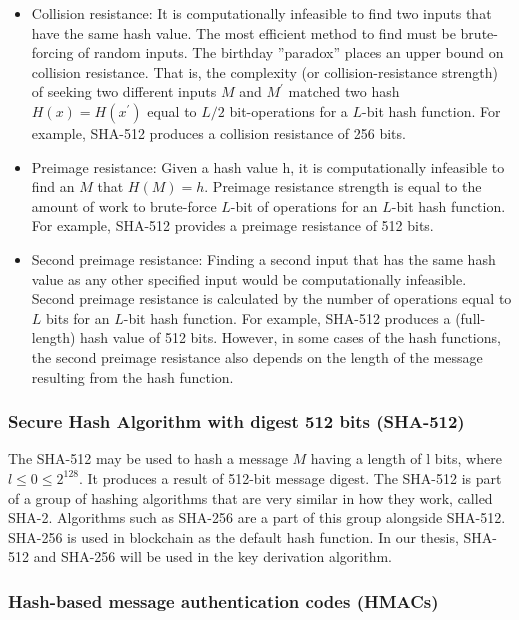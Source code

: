 \begin{itemize}
  \item Collision resistance: It is computationally infeasible to find two inputs that have the same hash value. The most efficient method to find must be brute-forcing of random inputs. The birthday ”paradox” places an upper bound on collision resistance. That is, the complexity (or collision-resistance strength) of seeking two different inputs $M$ and $M^{\prime}$ matched two hash $H(x) = H(x^{\prime})$ equal to $L/2$ bit-operations for a $L$-bit hash function. For example, SHA-512 produces a collision resistance of 256 bits.

  \item Preimage resistance: Given a hash value h, it is computationally infeasible to find an $M$ that $H(M)=h$. Preimage resistance strength is equal to the amount of work to brute-force $L$-bit of operations for an $L$-bit hash function. For example, SHA-512 provides a preimage resistance of 512 bits.

  \item Second preimage resistance: Finding a second input that has the same hash value as any other specified input would be computationally infeasible. Second preimage resistance is calculated by the number of operations equal to $L$ bits for an $L$-bit hash function. For example, SHA-512 produces a (full-length) hash value of 512 bits. However, in some cases of the hash functions, the second preimage resistance also depends on the length of the message resulting from the hash function.
\end{itemize}


\subsubsection{Secure Hash Algorithm with digest 512 bits (SHA-512)}

The SHA-512 may be used to hash a message $M$ having a length of l bits, where $l \leq 0 \leq 2^{128}$. It produces a result of 512-bit message digest. The SHA-512 is part of a group of hashing algorithms that are very similar in how they work, called SHA-2. Algorithms such as SHA-256 are a part of this group alongside SHA-512. SHA-256 is used in blockchain as the default hash function. In our thesis, SHA-512 and SHA-256 will be used in the key derivation algorithm.

\subsubsection{Hash-based message authentication codes (HMACs)}


